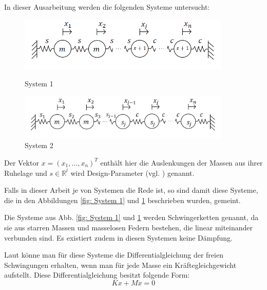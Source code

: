 \documentclass[a4paper,12pt]{report}
\newcommand{\R}{\mathbb R}
\newcommand{\zitat}[1]{\glqq #1\grqq}
\newcommand{\1}{\mathds{1}}
\theoremstyle{plain} %
\theoremstyle{definition} %
\theoremstyle{remark}
\begin{document}
      In dieser Ausarbeitung werden die folgenden Systeme untersucht:
      \begin{figure}[h!t]
            \centering
            \begin{minipage}[ht]{0.49\linewidth}
                  \centering
                  \includegraphics[width=0.9\textwidth, keepaspectratio]{./System1.png}
                  \caption{System 1}
                  \label{fig: System 1}
            \end{minipage}
            \hfill
            \begin{minipage}[ht]{0.49\linewidth}
                  \centering
                  \includegraphics[width=0.9\textwidth, keepaspectratio]{./System2.png}
                  \caption{System 2}
                  \label{fig: System 2}
            \end{minipage}
      \end{figure}

      Der Vektor $x = (x_1,\dots,x_n)^T$ enthält hier die Auslenkungen der Massen aus ihrer Ruhelage und $s\in\R^l$ wird Design-Parameter (vgl. \cite[S. 2]{hauptteilTkachuk}) genannt.

      Falls in dieser Arbeit je von \zitat{Systemen} die Rede ist, so sind damit diese Systeme, die in den Abbildungen \ref{fig: System 1} und \ref{fig: System 2} beschrieben wurden, gemeint.

      Die Systeme aus Abb. \ref{fig: System 1} und \ref{fig: System 2} werden \zitat{Schwingerketten}\cite[S. 236]{maschinendynamikDresig} genannt,
      da sie aus starren Massen und masselosen Federn bestehen, die linear miteinander verbunden sind.
      Es existiert zudem in diesen Systemen keine Dämpfung.
      
      Laut \cite[S. 362-365]{maschinendynamikDresig} könne man für diese Systeme die \zitat{Differentialgleichung der freien Schwingungen}\cite[S. 365]{maschinendynamikDresig}
      erhalten, wenn man für jede Masse ein Kräftegleichgewicht aufstellt.
      Diese Differentialgleichung besitzt folgende Form:
      \begin{equation}
            \label{eqn: Dgl freie Schwingungen}
            Kx+M\ddot x = 0
      \end{equation}
\end{document}
